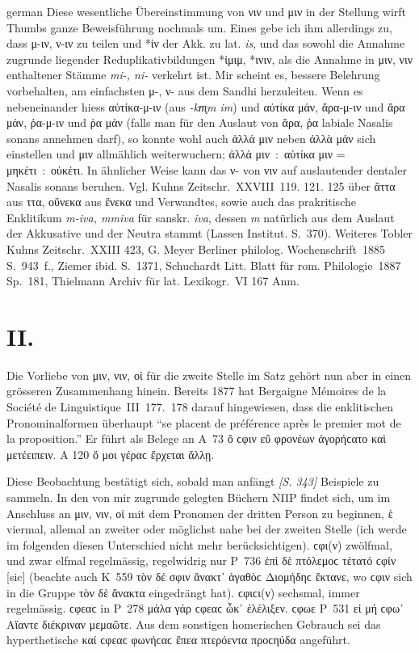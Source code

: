 \begin{otherlanguage*}{german}
Diese wesentliche Übereinstimmung von νιν und μιν in der Stellung wirft Thumbs ganze Beweisführung nochmals um. Eines gebe ich ihm allerdings zu, dass μ-ιν, ν-ιν zu teilen und *ἰν der Akk. zu lat. \emph{is}, und das sowohl die Annahme zugrunde liegender Reduplikativbildungen *ἰμιμ, *ινιν, als die Annahme in μιν, νιν enthaltener Stämme \emph{mi-, ni-} verkehrt ist. Mir scheint es, bessere Belehrung vorbehalten, am einfachsten μ-, ν- aus dem Sandhi herzuleiten. Wenn es nebeneinander hiess αὐτίκα-μ-ιν (aus \emph{-km̥m im}) und αὐτίκα μάν, ἄρα-μ-ιν und ἄρα μάν, ῥα-μ-ιν und ῥα μάν (falls man für den Auslaut von ἄρα, ῥα labiale Nasalis sonans annehmen darf), so konnte wohl auch ἀλλά μιν neben ἀλλὰ μάν sich einstellen und μιν allmählich weiterwuchern; ἀλλά μιν~:~αὐτίκα μιν = μηκέτι~:~οὐκέτι. In ähnlicher Weise kann das ν- von νιν auf auslautender dentaler Nasalis sonans beruhen. Vgl. Kuhns Zeitschr.~XXVIII~119. 121. 125 über ἄττα aus ττα, οὕνεκα aus ἕνεκα und Verwandtes, sowie auch das prakritische Enklitikum \emph{m-iva, mmiva} für sanskr. \emph{iva}, dessen \emph{m} natürlich aus dem Auslaut der Akkusative und der Neutra stammt (Lassen Institut. S.~370). Weiteres Tobler Kuhns Zeitschr.~XXIII 423, G. Meyer Berliner philolog. Wochenschrift~1885 S.~943~f., Ziemer ibid. S.~1371, Schuchardt Litt. Blatt für rom. Philologie~1887 Sp.~181, Thielmann Archiv für lat. Lexikogr.~VI 167 Anm.

\section*{II.}

Die Vorliebe von μιν, νιν, οἱ für die zweite Stelle im Satz gehört nun aber in einen grösseren Zusammenhang hinein. Bereits 1877 hat Bergaigne Mémoires de la Société de Linguistique~III~177.~178 darauf hingewiesen, dass die enklitischen Pronominalformen überhaupt “se placent de préférence après le premier mot de la proposition.” Er führt als Belege an Α~73 ὅ ϲφιν εὔ φρονέων ἀγορήϲατο καὶ μετέειπειν. Α 120 ὅ μοι γέραϲ ἔρχεται ἄλλῃ.

Diese Beobachtung bestätigt sich, sobald man anfängt \hypertarget{p343}{\emph{[S. 343]}}\label{p343} Beispiele zu sammeln. In den von mir zugrunde gelegten Büchern ΝΠΡ findet sich, um im Anschluss an μιν, νιν, οἱ mit dem Pronomen der dritten Person zu beginnen, ἑ viermal, allemal an zweiter oder möglichst nahe bei der zweiten Stelle (ich werde im folgenden diesen Unterschied nicht mehr berücksichtigen). ϲφι(ν) zwölfmal, und zwar elfmal regelmässig, regelwidrig nur Ρ~736 ἐπὶ δὲ πτόλεμοϲ τέτατό ϲφίν [sic]
(beachte auch Κ~559 τὸν δέ σφιν ἄνακτ᾽ ἀγαθὸϲ Διομήδηϲ ἔκτανε, wo ϲφιν sich in die Gruppe τὸν δὲ ἄνακτα eingedrängt hat). ϲφιϲι(ν) sechsmal, immer regelmässig. ϲφεαϲ in Ρ~278 μάλα γάρ ϲφεαϲ ὦκ᾽ ἐλέλιξεν. ϲφωε Ρ~531 εἰ μή ϲφω᾽ Αἴαντε διέκριναν μεμαῶτε. Aus dem sonstigen homerischen Gebrauch sei das hyperthetische καί ϲφεαϲ φωνήϲαϲ ἔπεα πτερόεντα προϲηύδα angeführt.


\end{otherlanguage*}
